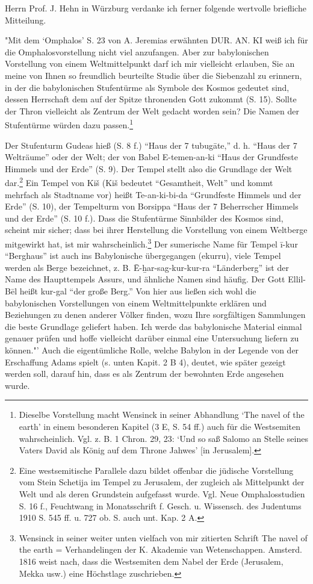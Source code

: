 \documentclass[a4paper, 11pt, oneside]{article}
\begin{document}
Herrn Prof. J. Hehn in Würzburg verdanke ich ferner folgende wertvolle briefliche Mitteilung.

"Mit dem `Omphalos' S. 23 von A. Jeremias erwähnten DUR. AN. KI weiß ich für die Omphalosvorstellung nicht viel anzufangen. Aber zur babylonischen Vorstellung von einem Weltmittelpunkt darf ich mir vielleicht erlauben, Sie an meine von Ihnen so freundlich beurteilte Studie über die Siebenzahl zu erinnern, in der die babylonischen Stufentürme als Symbole des Kosmos gedeutet sind, dessen Herrschaft dem auf der Spitze thronenden Gott zukommt (S. 15). Sollte der Thron vielleicht als Zentrum der Welt gedacht worden sein? Die Namen der Stufentürme würden dazu passen.\footnote{Dieselbe Vorstellung macht Wensinck in seiner Abhandlung `The navel of the earth' in einem besonderen Kapitel (3 E, S. 54 ff.) auch für die Westsemiten wahrscheinlich. Vgl. z. B. 1 Chron. 29, 23: `Und so saß Salomo an Stelle seines Vaters David als König auf dem Throne Jahwes' [in Jerusalem].}

Der Stufenturm Gudeas hieß (S. 8 f.) "`Haus der 7 tubugāte,"' d. h. "`Haus der 7 Welträume"' oder der Welt; der von Babel E-temen-an-ki "`Haus der Grundfeste Himmels und der Erde"' (S. 9). Der Tempel stellt also die Grundlage der Welt dar.\footnote{Eine westsemitische Parallele dazu bildet offenbar die jüdische Vorstellung vom Stein Schetija im Tempel zu Jerusalem, der zugleich als Mittelpunkt der Welt und als deren Grundstein aufgefasst wurde. Vgl. Neue Omphalosstudien S. 16 f., Feuchtwang in Monatsschrift f. Gesch. u. Wissensch. des Judentums 1910 S. 545 ff. u. 727 ob. S. auch unt. Kap. 2 A.} Ein Tempel von Kiš (Kiš bedeutet "`Gesamtheit, Welt"' und kommt mehrfach als Stadtname vor) heißt Te-an-ki-bi-da "`Grundfeste Himmels und der Erde"' (S. 10), der Tempelturm von Borsippa "`Haus der 7 Beherrscher Himmels und der Erde"' (S. 10 f.). Dass die Stufentürme Sinnbilder des Kosmos sind, scheint mir sicher; dass bei ihrer Herstellung die Vorstellung von einem Weltberge mitgewirkt hat, ist mir wahrscheinlich.\footnote{Wensinck in seiner weiter unten vielfach von mir zitierten Schrift The navel of the earth = Verhandelingen der K. Akademie van Wetenschappen. Amsterd. 1816 weist nach, dass die Westsemiten dem Nabel der Erde (Jerusalem, Mekka usw.) eine Höchstlage zuschrieben.} Der sumerische Name für Tempel ī-kur "`Berghaus"' ist auch ins Babylonische übergegangen (ekurru), viele Tempel werden als Berge bezeichnet, z. B. Ē-\b{h}ar-sag-kur-kur-ra "`Länderberg"' ist der Name des Haupttempels Assurs, und ähnliche Namen sind häufig. Der Gott Ellil-Bēl heißt kur-gal "`der große Berg."' Von hier aus ließen sich wohl die babylonischen Vorstellungen von einem Weltmittelpunkte erklären und Beziehungen zu denen anderer Völker finden, wozu Ihre sorgfältigen Sammlungen die beste Grundlage geliefert haben. Ich werde das babylonische Material einmal genauer prüfen und hoffe vielleicht darüber einmal eine Untersuchung liefern zu können."' Auch die eigentümliche Rolle, welche Babylon in der Legende von der Erschaffung Adams spielt (s. unten Kapit. 2 B 4), deutet, wie später gezeigt werden soll, darauf hin, dass es als Zentrum der bewohnten Erde angesehen wurde.
\end{document}
